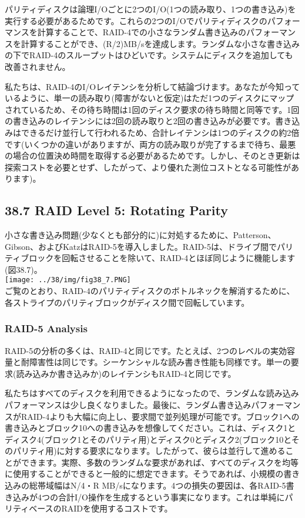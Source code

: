 パリティディスクは論理I/Oごとに2つのI/O(1つの読み取り、1つの書き込み)を実行する必要があるためです。これらの2つのI/Oでパリティディスクのパフォーマンスを計算することで、RAID-4での小さなランダム書き込みのパフォーマンスを計算することができ、(R/2)MB/sを達成します。ランダムな小さな書き込みの下でRAID-4のスループットはひどいです。システムにディスクを追加しても改善されません。

私たちは、RAID-4のI/Oレイテンシを分析して結論づけます。あなたが今知っているように、単一の読み取り(障害がないと仮定)はただ1つのディスクにマップされているため、その待ち時間は1回のディスク要求の待ち時間と同等です。1回の書き込みのレイテンシには2回の読み取りと2回の書き込みが必要です。書き込みはできるだけ並行して行われるため、合計レイテンシは1つのディスクの約2倍です(いくつかの違いがありますが、両方の読み取りが完了するまで待ち、最悪の場合の位置決め時間を取得する必要があるためです。しかし、そのとき更新は探索コストを必要とせず、したがって、より優れた測位コストとなる可能性があります)。

\hypertarget{raid-level-5-rotating-parity}{%
\subsection*{38.7 RAID Level 5: Rotating
Parity}\label{raid-level-5-rotating-parity}}

小さな書き込み問題(少なくとも部分的に)に対処するために、Patterson、Gibson、およびKatzはRAID-5を導入しました。RAID-5は、ドライブ間でパリティブロックを回転させることを除いて、RAID-4とほぼ同じように機能します(図38.7)。\\
\texttt{[image: ../38/img/fig38\_7.PNG]}\\
ご覧のとおり、RAID-4のパリティディスクのボトルネックを解消するために、各ストライプのパリティブロックがディスク間で回転しています。

\hypertarget{raid-5-analysis}{%
\subsubsection*{RAID-5 Analysis}\label{raid-5-analysis}}

RAID-5の分析の多くは、RAID-4と同じです。たとえば、2つのレベルの実効容量と耐障害性は同じです。シーケンシャルな読み書き性能も同様です。単一の要求(読み込みか書き込みか)のレイテンシもRAID-4と同じです。

私たちはすべてのディスクを利用できるようになったので、ランダムな読み込みパフォーマンスは少し良くなりました。最後に、ランダム書き込みパフォーマンスがRAID-4よりも大幅に向上し、要求間で並列処理が可能です。ブロック1への書き込みとブロック10への書き込みを想像してください。これは、ディスク1とディスク4(ブロック1とそのパリティ用)とディスク0とディスク2(ブロック10とそのパリティ用)に対する要求になります。したがって、彼らは並行して進めることができます。実際、多数のランダムな要求があれば、すべてのディスクを均等に使用することができると一般的に想定できます。そうであれば、小規模の書き込みの総帯域幅はN/4・R
MB/sになります。4つの損失の要因は、各RAID-5書き込みが4つの合計I/O操作を生成するという事実になります。これは単純にパリティベースのRAIDを使用するコストです。


